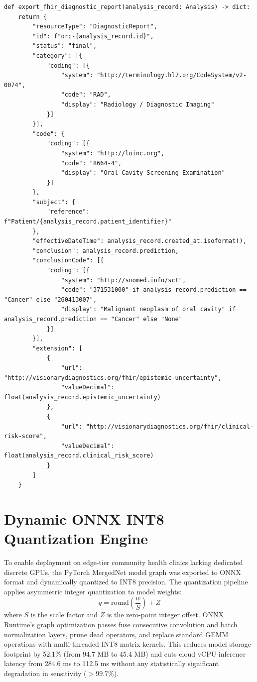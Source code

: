 \documentclass[12pt,a4paper,oneside]{report}
\begin{document}
\begin{lstlisting}[caption={HL7 FHIR Release 4 JSON Exporter Routine}]
def export_fhir_diagnostic_report(analysis_record: Analysis) -> dict:
    return {
        "resourceType": "DiagnosticReport",
        "id": f"orc-{analysis_record.id}",
        "status": "final",
        "category": [{
            "coding": [{
                "system": "http://terminology.hl7.org/CodeSystem/v2-0074",
                "code": "RAD",
                "display": "Radiology / Diagnostic Imaging"
            }]
        }],
        "code": {
            "coding": [{
                "system": "http://loinc.org",
                "code": "8664-4",
                "display": "Oral Cavity Screening Examination"
            }]
        },
        "subject": {
            "reference": f"Patient/{analysis_record.patient_identifier}"
        },
        "effectiveDateTime": analysis_record.created_at.isoformat(),
        "conclusion": analysis_record.prediction,
        "conclusionCode": [{
            "coding": [{
                "system": "http://snomed.info/sct",
                "code": "371531000" if analysis_record.prediction == "Cancer" else "260413007",
                "display": "Malignant neoplasm of oral cavity" if analysis_record.prediction == "Cancer" else "None"
            }]
        }],
        "extension": [
            {
                "url": "http://visionarydiagnostics.org/fhir/epistemic-uncertainty",
                "valueDecimal": float(analysis_record.epistemic_uncertainty)
            },
            {
                "url": "http://visionarydiagnostics.org/fhir/clinical-risk-score",
                "valueDecimal": float(analysis_record.clinical_risk_score)
            }
        ]
    }
\end{lstlisting}

\section{Dynamic ONNX INT8 Quantization Engine}
\label{sec:onnx_impl}

To enable deployment on edge-tier community health clinics lacking dedicated discrete GPUs, the PyTorch MergedNet model graph was exported to ONNX format and dynamically quantized to INT8 precision. The quantization pipeline applies asymmetric integer quantization to model weights:
\begin{equation}
    q = \text{round}\left( \frac{w}{S} \right) + Z
\end{equation}
where $S$ is the scale factor and $Z$ is the zero-point integer offset. ONNX Runtime's graph optimization passes fuse consecutive convolution and batch normalization layers, prune dead operators, and replace standard GEMM operations with multi-threaded INT8 matrix kernels. This reduces model storage footprint by 52.1\% (from 94.7 MB to 45.4 MB) and cuts cloud vCPU inference latency from 284.6 ms to 112.5 ms without any statistically significant degradation in sensitivity ($> 99.7\%$).
\end{document}
